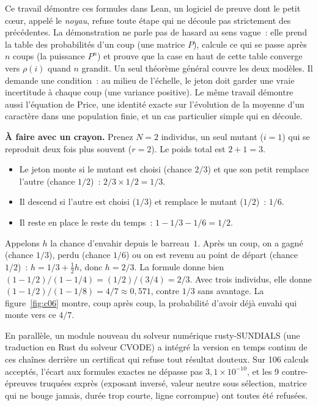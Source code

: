 Ce travail démontre ces formules dans Lean, un logiciel de preuve dont le petit c\oe ur, appelé le \emph{noyau},
refuse toute étape qui ne découle pas strictement des précédentes. La démonstration ne parle pas de hasard au sens
vague~: elle prend la table des probabilités d'un coup (une matrice $P$), calcule ce qui se passe après $n$ coups
(la puissance $P^n$) et prouve que la case \og en haut\fg{} de cette table converge vers $\rho(i)$ quand $n$ grandit.
Un seul théorème général couvre les deux modèles. Il demande une condition~: au milieu de l'échelle, le jeton doit
garder une vraie incertitude à chaque coup (une \og variance\fg{} positive). Le même travail démontre aussi
l'équation de Price, une identité exacte sur l'évolution de la moyenne d'un caractère dans une population finie, et
un cas particulier simple qui en découle.

\begin{encadre}
\textbf{À faire avec un crayon.} Prenez $N=2$ individus, un seul mutant ($i=1$) qui se reproduit deux
fois plus souvent ($r=2$). Le poids total est $2+1=3$.
\begin{itemize}
\item Le jeton monte si le mutant est choisi (chance $2/3$) et que son petit remplace l'autre (chance $1/2$)~:
  $2/3\times1/2=1/3$.
\item Il descend si l'autre est choisi ($1/3$) et remplace le mutant ($1/2$)~: $1/6$.
\item Il reste en place le reste du temps~: $1-1/3-1/6=1/2$.
\end{itemize}
Appelons $h$ la chance d'envahir depuis le barreau~$1$. Après un coup, on a gagné (chance $1/3$), perdu (chance
$1/6$) ou on est revenu au point de départ (chance $1/2$)~: $h=1/3+\tfrac12 h$, donc $h=2/3$. La formule donne
bien $(1-1/2)/(1-1/4)=(1/2)/(3/4)=2/3$. Avec trois individus, elle donne $(1-1/2)/(1-1/8)=4/7\approx0{,}571$, contre
$1/3$ sans avantage. La figure~\ref{fig:c06} montre, coup après coup, la probabilité d'avoir déjà envahi qui monte
vers ce $4/7$.
\end{encadre}

En parallèle, un module nouveau du solveur numérique rusty-SUNDIALS (une traduction en Rust du solveur CVODE) a
intégré la version en temps continu de ces chaînes derrière un \og certificat\fg{} qui refuse tout résultat douteux.
Sur 106 calculs acceptés, l'écart aux formules exactes ne dépasse pas $3{,}1\times10^{-10}$, et les 9 contre-épreuves
truquées exprès (exposant inversé, valeur neutre sous sélection, matrice qui ne bouge jamais, durée trop courte,
ligne corrompue) ont toutes été refusées.

